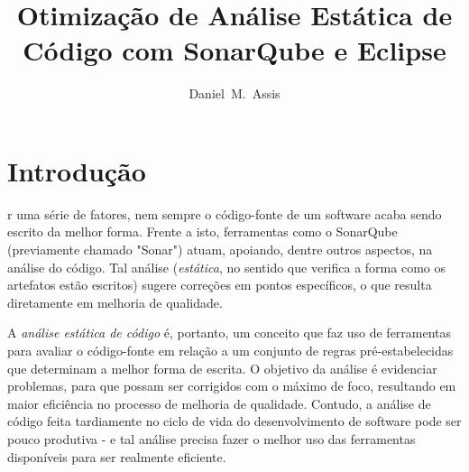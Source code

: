 \documentclass[12pt,journal,compsoc]{IEEEtran}
\begin{document}
\title{Otimização de Análise Estática de Código com SonarQube e Eclipse}
\author{
  Daniel~M.~Assis

}


\maketitle

\IEEEdisplaynotcompsoctitleabstractindextext
\IEEEpeerreviewmaketitle

\section{Introdução}

r uma série de fatores, nem sempre o código-fonte de um software acaba sendo escrito da melhor forma. Frente a isto, ferramentas como o SonarQube\cite{sonarqube} (previamente chamado "Sonar"\cite{sonar_sonarqube})  atuam, apoiando, dentre outros aspectos, na análise do código. Tal análise (\emph{estática}, no sentido que verifica a forma como os artefatos estão escritos) sugere correções em pontos específicos, o que resulta diretamente em melhoria de qualidade. 

A \emph{análise estática de código} é, portanto, um conceito que faz uso de ferramentas para avaliar o código-fonte em relação a um conjunto de regras pré-estabelecidas que determinam a melhor forma de escrita. O objetivo da análise é evidenciar problemas, para que possam ser corrigidos com o máximo de foco, resultando em maior eficiência no processo de melhoria de qualidade. Contudo, a análise de código feita tardiamente no ciclo de vida do desenvolvimento de software pode ser pouco produtiva - e tal análise precisa fazer o melhor uso das ferramentas disponíveis para ser realmente eficiente. 
\end{document}
